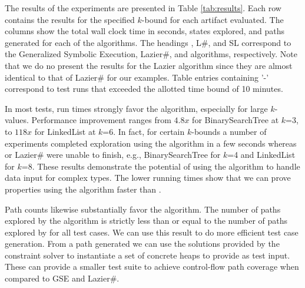 
The results of the experiments are presented in Table
\ref{tab:results}. Each row contains the results for the specified $k$-bound 
for each artifact evaluated. The columns show the total
wall clock time in seconds, states explored, and paths generated for
each of the algorithms. The headings \gsetxt{}, L\#, and SL correspond
to the Generalized Symbolic Execution, Lazier\#, and \symtxt{}
algorithms, respectively. Note that we do no present the results for
the Lazier algorithm since they are almost identical to that of Lazier\#
for our examples. Table entries containing '-' correspond to test runs
that exceeded the allotted time bound of 10 minutes.

In most tests, run times strongly favor the \symtxt{} algorithm, especially for
large $k$-values. Performance improvement ranges from $4.8x$ for
BinarySearchTree at $k$=3, to $118x$ for LinkedList at $k$=6. In fact,
for certain $k$-bounds a number of experiments completed exploration
using the \symtxt{} algorithm in a few seconds whereas \gsetxt{} or Lazier\# were
unable to finish, e.g., BinarySearchTree for $k$=4 and LinkedList for
$k$=8. These results demonstrate the potential of using the \symtxt{} algorithm 
to handle data input for complex types. The lower running times
show that we can prove properties using the \symtxt{} algorithm faster than
\gsetxt{}.


Path counts likewise substantially favor the \symtxt{} algorithm. The number of
paths explored by the algorithm is strictly less than or equal to the number
of paths explored by \gsetxt{} for all test cases. We can use this
result to do more efficient test case generation. From a path
generated we can use the solutions provided by the constraint solver
to instantiate a set of concrete heaps to provide as test input. These
can provide a smaller test suite to achieve control-flow path coverage when
compared to GSE and Lazier\#.



